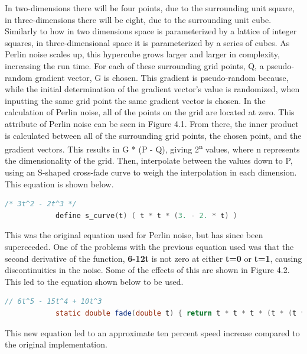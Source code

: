 \documentclass[10pt]{report}
\begin{document}
		In two-dimensions there will be four points, due to the surrounding unit square, in three-dimensions there will be eight, due to the surrounding unit cube. Similarly to how in two dimensions space is parameterized by a lattice of integer squares, in three-dimensional space it is parameterized by a series of cubes. As Perlin noise scales up, this hypercube grows larger and larger in complexity, increasing the run time. For each of these surrounding grid points, Q, a pseudo-random gradient vector, G is chosen. This gradient is pseudo-random because, while the initial determination of the gradient vector's value is randomized, when inputting the same grid point the same gradient vector is chosen. In the calculation of Perlin noise, all of the points on the grid are located at zero. This attribute of Perlin noise can be seen in Figure 4.1. From there, the inner product is calculated between all of the surrounding grid points, the chosen point, and the gradient vectors. This results in G * (P - Q), giving 2\textsuperscript{n} values, where n represents the dimensionality of the grid. Then, interpolate between the values down to P, using an S-shaped cross-fade curve to weigh the interpolation in each dimension. This equation is shown below.
		
		\begin{lstlisting}[language=C]
			/* 3t^2 - 2t^3 */
			define s_curve(t) ( t * t * (3. - 2. * t) )
		\end{lstlisting}
	
		This was the original equation used for Perlin noise, but has since been superceeded. One of the problems with the previous equation used was that the second derivative of the function, \textbf{6-12t} is not zero at either \textbf{t=0} or \textbf{t=1}, causing discontinuities in the noise. Some of the effects of this are shown in Figure 4.2. This led to the equation shown below to be used. 
		
		\begin{lstlisting}[language=Java]
			// 6t^5 - 15t^4 + 10t^3
			static double fade(double t) { return t * t * t * (t * (t * 6 - 15) + 10); }
		\end{lstlisting}
	
		This new equation led to an approximate ten percent speed increase compared to the original implementation. 
		
\end{document}
